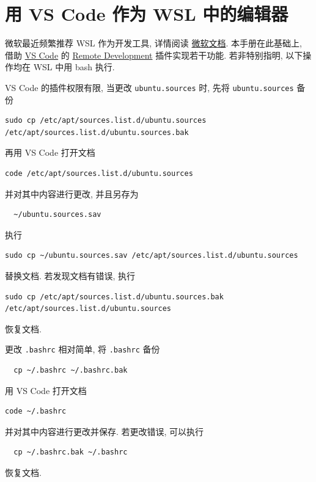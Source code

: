 \section{用 VS Code 作为 WSL 中的编辑器}\label{sec:addition:wsl-editor}

微软最近频繁推荐 WSL 作为开发工具,
详情阅读%
\href{https://learn.microsoft.com/zh-cn/windows/wsl/tutorials/wsl-vscode}{微软文档}.
本手册在此基础上,
借助 \href{https://code.visualstudio.com/download}{VS Code} 的 \href{https://marketplace.visualstudio.com/items?itemName=ms-vscode-remote.vscode-remote-extensionpack}{Remote Development}
插件实现若干功能.
若非特别指明,
以下操作均在 WSL 中用 \textsf{bash} 执行.

VS Code 的插件权限有限,
当更改 \texttt{ubuntu.sources} 时,
先将 \texttt{ubuntu.sources} 备份
\begin{lstlisting}[deletekeywords = apt]
  sudo cp /etc/apt/sources.list.d/ubuntu.sources /etc/apt/sources.list.d/ubuntu.sources.bak
\end{lstlisting}
再用 VS Code 打开文档
\begin{lstlisting}[deletekeywords = apt, morekeywords = code]
  code /etc/apt/sources.list.d/ubuntu.sources
\end{lstlisting}
并对其中内容进行更改,
并且另存为
\begin{lstlisting}
  ~/ubuntu.sources.sav
\end{lstlisting}
执行
\begin{lstlisting}[deletekeywords = apt]
  sudo cp ~/ubuntu.sources.sav /etc/apt/sources.list.d/ubuntu.sources
\end{lstlisting}
替换文档.
若发现文档有错误,
执行
\begin{lstlisting}[deletekeywords = apt]
  sudo cp /etc/apt/sources.list.d/ubuntu.sources.bak /etc/apt/sources.list.d/ubuntu.sources
\end{lstlisting}
恢复文档.

更改 \texttt{.bashrc} 相对简单,
将 \texttt{.bashrc} 备份
\begin{lstlisting}
  cp ~/.bashrc ~/.bashrc.bak
\end{lstlisting}
用 VS Code 打开文档
\begin{lstlisting}[morekeywords = code]
  code ~/.bashrc
\end{lstlisting}
并对其中内容进行更改并保存.
若更改错误,
可以执行
\begin{lstlisting}
  cp ~/.bashrc.bak ~/.bashrc
\end{lstlisting}
恢复文档.

